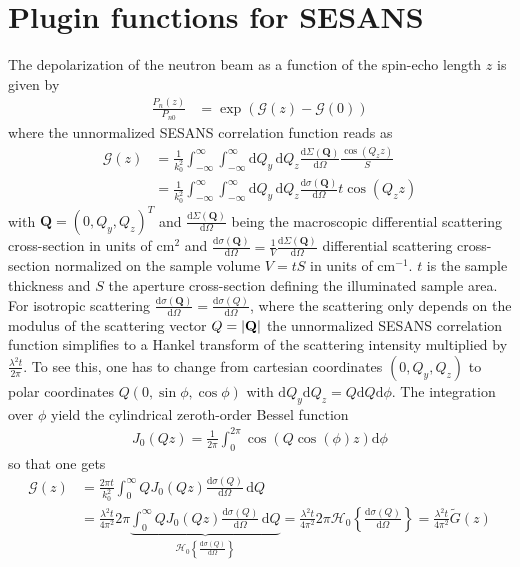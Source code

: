 \clearpage
\chapter{Plugin functions for SESANS}
\label{ch:pluginsSESANS}

The depolarization of the neutron beam as a function of the spin-echo length $z$ is given by
\begin{align}
\frac{P_n(z)}{P_{n0}}&=\exp\left(\mathcal{G}(z)-\mathcal{G}(0)\right)
\end{align}
where the unnormalized SESANS correlation function reads as
\begin{align}
\mathcal{G}(z) &= \frac{1}{k_0^2} \int_{-\infty}^{\infty}\int_{-\infty}^{\infty} \mathrm{d}Q_y\, \mathrm{d}Q_z \frac{\mathrm{d}\Sigma(\mathbf{Q})}{\mathrm{d}\Omega}\frac{\cos(Q_z z)}{S} \\
             &= \frac{1}{k_0^2} \int_{-\infty}^{\infty}\int_{-\infty}^{\infty} \mathrm{d}Q_y\, \mathrm{d}Q_z  \frac{\mathrm{d}\sigma(\mathbf{Q})}{\mathrm{d}\Omega}t \cos(Q_z z)
\end{align}
with $\mathbf{Q}=(0,Q_y,Q_z)^T$ and $\frac{\mathrm{d}\Sigma(\mathbf{Q})}{\mathrm{d}\Omega}$ being the macroscopic differential scattering cross-section in units of cm$^2$ and $\frac{\mathrm{d}\sigma(\mathbf{Q})}{\mathrm{d}\Omega}=\frac{1}{V}\frac{\mathrm{d}\Sigma(\mathbf{Q})}{\mathrm{d}\Omega}$ differential scattering cross-section normalized on the sample volume $V=tS$ in units of cm$^{-1}$. $t$ is the sample thickness and $S$ the aperture cross-section defining the illuminated sample area. For isotropic scattering $\frac{\mathrm{d}\sigma(\mathbf{Q})}{\mathrm{d}\Omega}=\frac{\mathrm{d}\sigma(Q)}{\mathrm{d}\Omega}$, where the scattering only depends on the modulus of the scattering vector $Q=\abs{\mathbf{Q}}$ the unnormalized SESANS correlation function simplifies to a Hankel transform of the scattering intensity multiplied by $\frac{\lambda^2 t}{2\pi}$. To see this, one has to change from cartesian coordinates $(0,Q_y,Q_z)$ to polar coordinates $Q (0,\sin\phi,\cos\phi)$ with $\mathrm{d}Q_y \mathrm{d}Q_z = Q\mathrm{d}Q \mathrm{d}\phi$. The integration over $\phi$ yield the cylindrical zeroth-order Bessel function
\begin{align}
J_0(Qz)=\frac{1}{2\pi}\int_{0}^{2\pi} \cos\left(Q\cos(\phi)z\right) \mathrm{d}\phi
\end{align}
so that one gets
\begin{align}
\mathcal{G}(z) &= \frac{2\pi t}{k_0^2} \int_{0}^{\infty} Q J_0(Qz) \frac{\mathrm{d}\sigma(Q)}{\mathrm{d}\Omega} \, \mathrm{d}Q \\
&= \frac{\lambda^2 t}{4\pi^2} 2\pi\underbrace{\int_{0}^{\infty} Q J_0(Qz) \frac{\mathrm{d}\sigma(Q)}{\mathrm{d}\Omega} \, \mathrm{d}Q}_{\mathcal{H}_0\left\{\frac{\mathrm{d}\sigma(Q)}{\mathrm{d}\Omega}\right\}} = \frac{\lambda^2 t}{4\pi^2}  2\pi \mathcal{H}_0\left\{\frac{\mathrm{d}\sigma(Q)}{\mathrm{d}\Omega}\right\} = \frac{\lambda^2 t}{4\pi^2} \tilde{G}(z)
\end{align}
